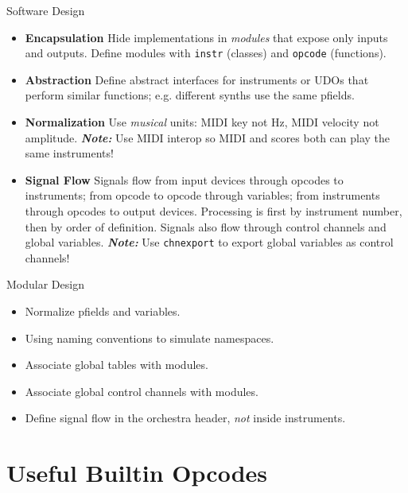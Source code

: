 \documentclass{beamer}
\begin{document}
    \begin{frame}{Software Design}
        \begin{itemize}
            \item \textbf{Encapsulation} Hide implementations in \textit{modules} that
            expose only inputs and outputs. Define modules with \texttt{instr} (classes) and
            \texttt{opcode} (functions).
            \item \textbf{Abstraction} Define abstract interfaces for instruments or
            UDOs that perform similar functions; e.g. different synths use the same
            pfields.
            \item \textbf{Normalization} Use \textit{musical} units: MIDI key not
            Hz, MIDI velocity not amplitude. \textit{\textbf{Note:}} Use MIDI interop so
            MIDI and scores both can play the same instruments!
            \item \textbf{Signal Flow} Signals flow from input devices through
            opcodes to instruments; from opcode to opcode through variables; from
            instruments through opcodes to output devices. Processing is first by
            instrument number, then by order of definition. Signals also flow through
            control channels and global variables. \textit{\textbf{Note:}} Use
            \texttt{chnexport} to  export global variables as control channels!
        \end{itemize}
    \end{frame}
    
    \begin{frame}{Modular Design}
        \begin{itemize}
            \item Normalize pfields and variables.
            \item Using naming conventions to simulate namespaces.
            \item Associate global tables with modules.
            \item Associate global control channels with modules.
            \item Define signal flow in the orchestra header, \textit{not} inside instruments.
        \end{itemize}
    \end{frame}
    
    \section{Useful Builtin Opcodes}
    
\end{document}
